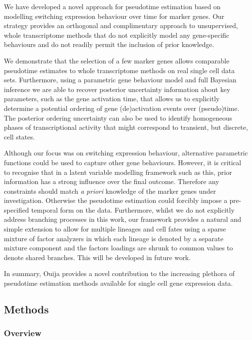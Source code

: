 We have developed a novel approach for pseudotime estimation based on modelling switching expression behaviour over time for marker genes. Our strategy provides an orthogonal and complimentary approach to unsupervised, whole transcriptome methods that do not explicitly model any gene-specific behaviours and do not readily permit the inclusion of prior knowledge.

We demonstrate that the selection of a few marker genes allows comparable pseudotime estimates to whole transcriptome methods on real single cell data sets. Furthermore, using a parametric gene behaviour model and full Bayesian inference we are able to recover posterior uncertainty information about key parameters, such as the gene activation time, that allows us to explicitly determine a potential ordering of gene (de)activation events over (pseudo)time. The posterior ordering uncertainty can also be used to identify homogeneous phases of transcriptional activity that might correspond to transient, but discrete, cell states.

Although our focus was on switching expression behaviour, alternative parametric functions could be used to capture other gene behaviours. However, it is critical to recognise that in a latent variable modelling framework such as this, prior information has a strong influence over the final outcome. Therefore any constraints should match \emph{a priori} knowledge of the marker genes under investigation. Otherwise the pseudotime estimation could forcibly impose a pre-specified temporal form on the data. Furthermore, whilst we do not explicitly address branching processes in this work, our framework provides a natural and simple extension to allow for multiple lineages and cell fates using a sparse mixture of factor analyzers in which each lineage is denoted by a separate mixture component and the factors loadings are shrunk to common values to denote shared branches. This will be developed in future work.

In summary, Ouija provides a novel contribution to the increasing plethora of pseudotime estimation methods available for single cell gene expression data.

\subsection{Methods}

\subsubsection{Overview}

